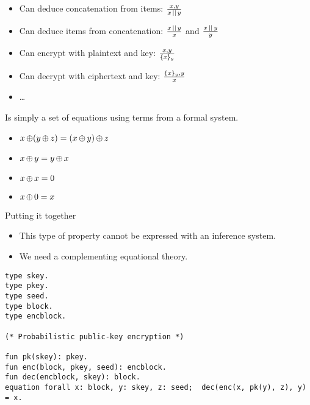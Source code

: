 \begin{frame}
  \begin{example}
    \begin{itemize}
      \item Can deduce concatenation from items: \(\frac{x, y}{x\operatorname{||} y}\)
      \item Can deduce items from concatenation: \(\frac{x\operatorname{||} y}{x}\) and 
        \(\frac{x\operatorname{||} y}{y}\)
      \item Can encrypt with plaintext and key: \(\frac{x, y}{\{x\}_{y}}\)
      \item Can decrypt with ciphertext and key: \(\frac{\{x\}_{y}, 
            y}{x}\)
      \item \dots
    \end{itemize}
  \end{example}
\end{frame}

\begin{frame}
  \begin{definition}
    Is simply a set of equations using terms from a formal system.  
  \end{definition}

  \begin{example}
    \begin{itemize}
      \item \(x\operatorname{\oplus} ( y\operatorname{\oplus} z ) = ( x\operatorname{\oplus} y ) \operatorname{\oplus} z\)
      \item \(x \operatorname{\oplus} y = y\operatorname{\oplus} x\)
      \item \(x\operatorname{\oplus} x = 0\)
      \item \(x\operatorname{\oplus} 0 = x\)
    \end{itemize}
  \end{example}
\end{frame}

\begin{frame}
  \begin{alertblock}{Putting it together}
    \begin{itemize}
      \item This type of property cannot be expressed with an inference system.
      \item We need a complementing equational theory.
    \end{itemize}
  \end{alertblock}
\end{frame}

\begin{frame}[fragile]
  \begin{example}
    \begin{lstlisting}
type skey.
type pkey.
type seed.
type block.
type encblock.

(* Probabilistic public-key encryption *)

fun pk(skey): pkey.
fun enc(block, pkey, seed): encblock.
fun dec(encblock, skey): block.
equation forall x: block, y: skey, z: seed;  dec(enc(x, pk(y), z), y) = x.
    \end{lstlisting}
  \end{example}
\end{frame}

